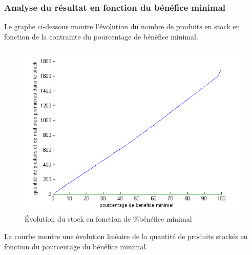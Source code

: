 \documentclass[12pt]{article}
\begin{document}
\subsubsection*{Analyse du résultat en fonction du bénéfice minimal}
Le graphe ci-dessous montre l'évolution du nombre de produits en stock en fonction de la contrainte du pourcentage de bénéfice minimal. 
\begin{figure}[H]
    \begin{center}
        \includegraphics[scale=0.8]{plots_partie1/plot_stock.png}
        \caption{
            \label{fig} Évolution du stock en fonction de \%bénéfice minimal
        }
    \end{center}
\end{figure} 
La courbe montre une évolution linéaire de la quantité de produits stockés en fonction du pourcentage du bénéfice minimal.\\
\end{document}
